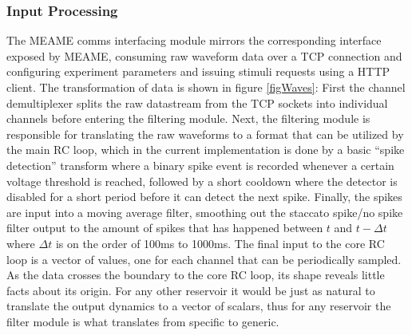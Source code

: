 \subsubsection{Input Processing}
The MEAME comms interfacing module mirrors the corresponding interface exposed
by MEAME, consuming raw waveform data over a TCP connection and configuring
experiment parameters and issuing stimuli requests using a HTTP client.
The transformation of data is shown in figure \ref{figWaves}:
First the channel demultiplexer splits the raw datastream from the TCP sockets into
individual channels before entering the filtering module.
Next, the filtering module is responsible for translating the raw waveforms to a
format that can be utilized by the main RC loop, which in the current
implementation is done by a basic ``spike detection'' transform where a binary
spike event is recorded whenever a certain voltage threshold is reached,
followed by a short cooldown where the detector is disabled for a short period
before it can detect the next spike. 
Finally, the spikes are input into a moving average filter, smoothing out the
staccato spike/no spike filter output to the amount of spikes that has happened
between $t$ and $t - \Delta t$ where $\Delta t$ is on the order of 100ms to 1000ms.
The final input to the core RC loop is a vector of values, one for each channel
that can be periodically sampled.
As the data crosses the boundary to the core RC loop, its shape reveals little
facts about its origin.
For any other reservoir it would be just as natural to translate the output
dynamics to a vector of scalars, thus for any reservoir the filter module is
what translates from specific to generic.
